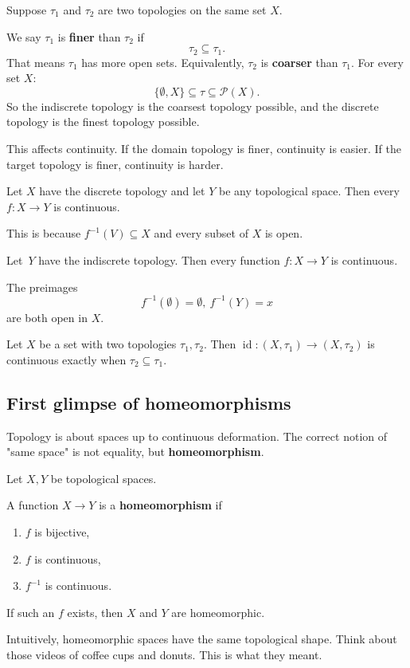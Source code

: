 Suppose $\tau_1$ and $\tau_2$ are two topologies on 
the same set $X$. 

We say $\tau_1$ is \textbf{finer} than $\tau_2$ if 
\[
    \tau_2 \subseteq \tau_1. 
\]
That means $\tau_1$ has more open sets. 
Equivalently, $\tau_2$ is \textbf{coarser} than 
$\tau_1$. For every set $X$: 
\[
    \{\emptyset, X\} \subseteq \tau \subseteq \mathcal P(X). 
\]
So the indiscrete topology is the coarsest topology possible, 
and the discrete topology is the finest topology possible. 

This affects continuity. If the domain topology is finer, 
continuity is easier. If the target topology is finer, continuity 
is harder. 

\begin{ex}
    Let $X$ have the discrete topology and let $Y$ be any 
    topological space. 
    Then every $f : X \to Y$ is continuous. 

    This is because $f^{-1}(V) \subseteq X$ and 
    every subset of $X$ is open. 
\end{ex}
\begin{ex}
    Let $Y$ have the indiscrete topology. Then 
    every function $f :X \to Y$ is continuous. 
    
    The preimages 
    \[
        f^{-1}(\emptyset) = \emptyset, \ 
        f^{-1}(Y) = x
    \]
    are both open in $X$. 
\end{ex}
\begin{ex}
    Let $X$ be a set with two topologies $\tau_1, \tau_2$. 
    Then $\operatorname{id} : (X, \tau_1) \to (X,\tau_2)$ is 
    continuous exactly when $\tau_2 \subseteq \tau_1$. 
\end{ex}

\subsection*{First glimpse of homeomorphisms}

Topology is about spaces up to continuous deformation. 
The correct notion of "same space" is not equality, but 
\textbf{homeomorphism}. 

\begin{defn}[Homeomorphism] 
    Let $X,Y$ be topological spaces. 

    A function $X \to Y$ is a \textbf{homeomorphism} if 
    \begin{enumerate}
        \item $f$ is bijective, 
        \item $f$ is continuous, 
        \item $f^{-1}$ is continuous.
    \end{enumerate}
    If such an $f$ exists, then $X$ and $Y$ are homeomorphic. 
\end{defn}
Intuitively, homeomorphic spaces have the same topological shape. 
Think about those videos of coffee cups and donuts. This is what 
they meant. 


